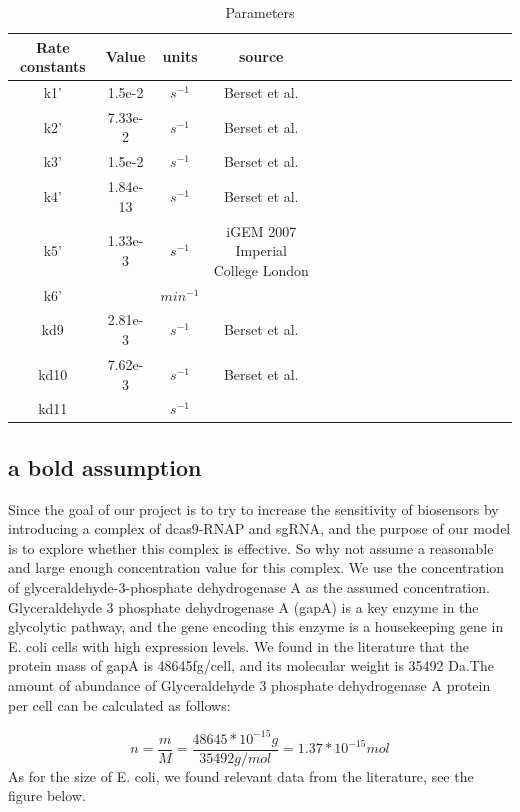 \begin{table}[htbp]
	\centering
	\caption{\label {tab:test} Parameters}
	\begin{tabular}{cccccccccccccccccc}
		\toprule
		Rate constants & Value& units & source \\
		\midrule
		k1' & 1.5e-2&$s^{-1} $& Berset et al. \\
		k2' & 7.33e-2 &$s^{-1} $& Berset et al.\\
		k3' & 1.5e-2 & $s^{-1}$ & Berset et al.\\
		k4' &1.84e-13&$s^{-1}$& Berset et al.\\
		k5'&  1.33e-3  & $s^{-1}$ & 	iGEM 2007 Imperial College London \\
		k6' &   & $min^{-1}$ &   \\
		kd9&2.81e-3  & $s^{-1}$ & Berset et al.  \\
		kd10  &7.62e-3 &$s^{-1}$ & Berset et al. \\
		kd11& & $s^{-1}$& \\
		
		\bottomrule
	\end{tabular}
\end{table}

\subsection{a bold assumption}
Since the goal of our project is to try to increase the sensitivity of biosensors by introducing a complex of dcas9-RNAP and sgRNA, and the purpose of our model is to explore whether this complex is effective. So why not assume a reasonable and large enough concentration value for this complex. We use the concentration of glyceraldehyde-3-phosphate dehydrogenase A as the assumed concentration. Glyceraldehyde 3 phosphate dehydrogenase A (gapA) is a key enzyme in the glycolytic pathway, and the gene encoding this enzyme is a housekeeping gene in E. coli cells with high expression levels. We found in the literature that the protein mass of gapA is 48645fg/cell, and its molecular weight is 35492 Da.The amount of abundance of Glyceraldehyde 3 phosphate dehydrogenase A protein per cell can be calculated as follows:

\begin{displaymath}
n=\frac{m}{M}=\frac{48645*10^{-15}g}{35492g/mol}=1.37*10^{-15}mol
\end{displaymath}
As for the size of E. coli, we found relevant data from the literature, see the figure below.

